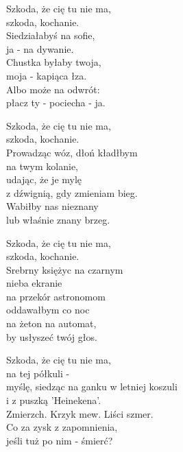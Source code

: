 \begin{text}
    Szkoda, że cię tu nie ma,\\
    szkoda, kochanie.\\
    Siedziałabyś na sofie,\\
    ja - na dywanie.\\
    Chustka byłaby twoja,\\
    moja - kapiąca łza.\\
    Albo może na odwrót:\\
    płacz ty - pociecha - ja.

    Szkoda, że cię tu nie ma,\\
    szkoda, kochanie.\\
    Prowadząc wóz, dłoń kładłbym\\
    na twym kolanie,\\
    udając, że je mylę\\
    z dźwignią, gdy zmieniam bieg.\\
    Wabiłby nas nieznany\\
    lub właśnie znany brzeg.

    Szkoda, że cię tu nie ma,\\
    szkoda, kochanie.\\
    Srebrny księżyc na czarnym\\
    nieba ekranie\\
    na przekór astronomom\\
    oddawałbym co noc\\
    na żeton na automat,\\
    by usłyszeć twój głos.

    Szkoda, że cię tu nie ma,\\
    na tej półkuli -\\
    myślę, siedząc na ganku w letniej koszuli\\
    i z puszką 'Heinekena'.\\
    Zmierzch. Krzyk mew. Liści szmer.\\
    Co za zysk z zapomnienia,\\
    jeśli tuż po nim - śmierć?
\end{text}
\begin{chord}

\end{chord}